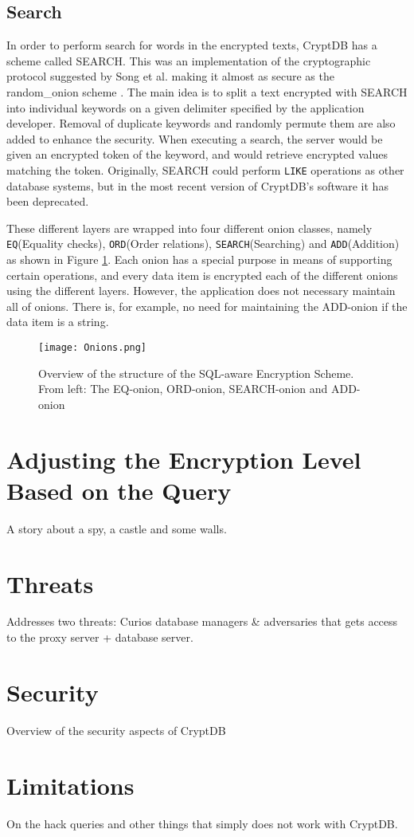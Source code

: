 \subsection{Search}
In order to perform search for words in the encrypted texts, CryptDB has a scheme called SEARCH. This was an implementation of the cryptographic protocol suggested by Song et al. making it almost as secure as the \gls{random_onion} scheme \citep{CryptDB_Main_Paper}. The main idea is to split a text encrypted with SEARCH into individual keywords on a given delimiter specified by the application developer. Removal of duplicate keywords and randomly permute them are also added to enhance the security. When executing a search, the server would be given an encrypted token of the keyword, and would retrieve encrypted values matching the token. Originally, SEARCH could perform \texttt{LIKE} operations as other database systems, but in the most recent version of CryptDB's software it has been deprecated. 


These different layers are wrapped into four different onion classes, namely \texttt{EQ}(Equality checks), \texttt{ORD}(Order relations), \texttt{SEARCH}(Searching) and \texttt{ADD}(Addition) as shown in Figure \ref{cryptdb_onions}. Each onion has a special purpose in means of supporting certain operations, and every data item is encrypted each of the different onions using the different layers. However, the application does not necessary maintain all of onions. There is, for example, no need for maintaining the ADD-onion if the data item is a string. 

\begin{figure}[ht]
	\texttt{[image: Onions.png]}
	\caption{Overview of the structure of the SQL-aware Encryption Scheme. From left: The EQ-onion, ORD-onion, SEARCH-onion and ADD-onion}
	\label{cryptdb_onions}
\end{figure}


\section{Adjusting the Encryption Level Based on the Query}
\label{adjust_enc_level}

A story about a spy, a castle and some walls.

\section{Threats}

Addresses two threats: Curios database managers \& adversaries that gets access to the proxy server + database server.


\section{Security}

Overview of the security aspects of CryptDB

\section{Limitations}

On the hack queries and other things that simply does not work with CryptDB. 